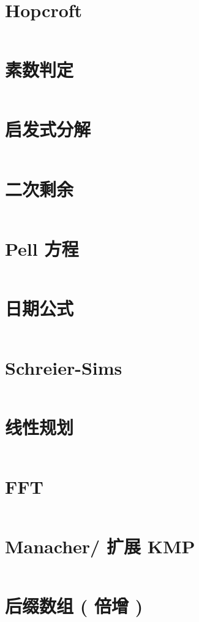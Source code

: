 \documentclass[titlepage,landscape,a4paper,10pt]{article}
\begin{document}
\begin{multicols}{2}
\begin{spacing}{0.8}
\section{Hopcroft}
\inputminted{cpp}{src/Hopcroft.cpp}

\section{素数判定}
\inputminted{cpp}{src/素数判定.cpp}

\section{启发式分解}
\inputminted{cpp}{src/启发式分解.cpp}

\section{二次剩余}
\inputminted{cpp}{src/二次剩余.cpp}

\section{Pell 方程}
\inputminted{cpp}{src/Pell方程.cpp}

\section{日期公式}
\inputminted{cpp}{improve/日期公式.cpp}

\section{Schreier-Sims}
\inputminted{cpp}{improve/SchreierSims.cpp}

\section{线性规划}
\inputminted{cpp}{src/线性规划.cpp}

\section{FFT}
\inputminted{cpp}{improve/FFT.cpp}

\section{Manacher/ 扩展 KMP}
\inputminted{cpp}{merge/Manacher.cpp}

\section{后缀数组 ( 倍增 )}
\inputminted{cpp}{src/后缀数组(nlogn).cpp}


\end{spacing}
\end{multicols}
\end{document}
